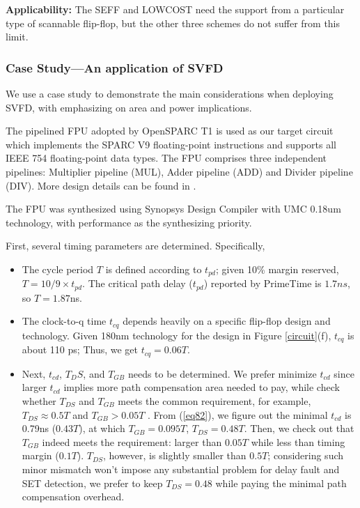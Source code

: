 {\bf Applicability:} The SEFF and LOWCOST need the support from a particular type of scannable flip-flop, but the other three schemes do not suffer from this limit.

\subsubsection{Case Study---An application of SVFD}

We use a case study to demonstrate the main considerations when deploying SVFD, with emphasizing on area and power implications.

The pipelined FPU adopted by OpenSPARC T1 \cite{OpenSPARC_06} is used as our target circuit which implements the SPARC V9 floating-point instructions and supports all IEEE 754 floating-point data types. The FPU comprises three independent pipelines: Multiplier pipeline (MUL), Adder pipeline (ADD) and Divider pipeline (DIV). More design details can be found in \cite{OpenSPARC_06}.

The FPU was synthesized using Synopsys Design Compiler with UMC 0.18um technology, with performance as the synthesizing priority.

\vspace{0.3cm} 

First, several timing parameters are determined. Specifically,
\begin{itemize}
  \item The cycle period $T$ is defined according to $t_{pd}$; given 10\% margin reserved,   $T={10}/{9}\times t_{pd}$. The critical path delay ($t_{pd}$) reported by PrimeTime is $1.7ns$, so $T=1.87$ns.

  \item The clock-to-q time $t_{cq}$ depends heavily on a specific flip-flop design and technology. Given 180nm technology for the design in Figure \ref{circuit}(f),  $t_{cq}$ is about 110 ps; Thus, we get $t_{cq} = 0.06T$.

  \item  Next, $t_{cd}$, $T_DS$, and $T_{GB}$ needs to be determined. We prefer minimize $t_{cd}$ since larger $t_{cd}$ implies more path compensation area needed to pay, while check whether $T_{DS}$ and $T_{GB}$ meets the common requirement, for example, $T_{DS}\approx0.5T$ and $T_{GB}>0.05T$ \cite{lowcost_date07} \cite{failure_prediction_07}. From (\ref{eq82}), we figure out the minimal $t_{cd}$ is 0.79ns ($0.43T$), at which $T_{GB}=0.095T$, $T_{DS}=0.48T$. Then, we check out that $T_{GB}$ indeed meets the requirement: larger than $0.05T$ while less than timing margin ($0.1T$). $T_{DS}$, however, is slightly smaller than $0.5T$; considering such minor mismatch won't impose any substantial problem for delay fault and SET detection, we prefer to keep $T_{DS}=0.48$ while paying the minimal path compensation overhead.
\end{itemize}


